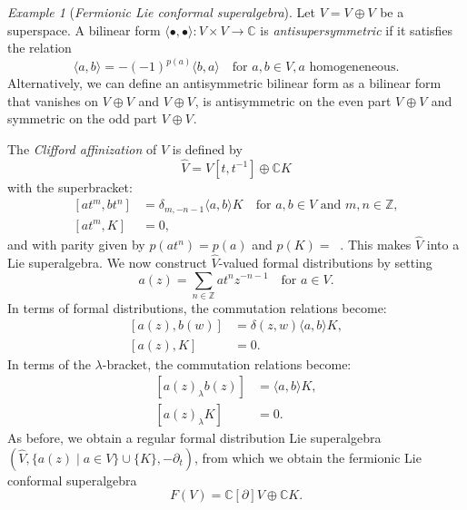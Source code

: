 \documentclass[a4paper, 12pt, reqno]{amsart}
\theoremstyle{remark}
\newtheorem{example}[theorem]{Example}
\numberwithin{equation}{subsection}
\DeclareMathOperator{\zero}{\overline{0}}
\DeclareMathOperator{\one}{\overline{1}}
\begin{document}
\begin{example}[\emph{Fermionic Lie conformal superalgebra}]
  \label{exa:3}
  Let $V = V_{\zero} \oplus V_{\one}$ be a superspace.
  A bilinear form $\langle\bullet, \bullet\rangle: V \times V \to \mathbb{C}$ is \emph{antisupersymmetric} if it satisfies the relation
  \begin{equation*}
    \langle a, b\rangle = -(-1)^{p(a)}\langle b, a\rangle \quad \text{for }a, b \in V, a\text{ homogeneneous}.
  \end{equation*}
  Alternatively, we can define an antisymmetric bilinear form as a bilinear form that vanishes on $V_{\zero} \oplus V_{\one}$ and $V_{\one} \oplus V_{\zero}$, is antisymmetric on the even part $V_{\zero} \oplus V_{\zero}$ and symmetric on the odd part $V_{\one} \oplus V_{\one}$.

  The \emph{Clifford affinization} of $V$ is defined by
  \begin{equation*}
    \widehat{V} = V[t, t^{-1}] \oplus \mathbb{C}K
  \end{equation*}
  with the superbracket:
  \begin{equation*}
    \begin{split}
      [at^m, bt^n] &= \delta_{m, -n - 1}\langle a, b\rangle K \quad \text{for }a, b \in V\text{ and }m, n \in \mathbb{Z}, \\
      [at^m, K] &= 0,
    \end{split}
  \end{equation*}
  and with parity given by $p(at^n) = p(a)$ and $p(K) = \zero$.
  This makes $\widehat{V}$ into a Lie superalgebra.
  We now construct $\widehat{V}$-valued formal distributions by setting
  \begin{equation*}
    a(z) = \sum_{n \in \mathbb{Z}}at^nz^{-n - 1} \quad \text{for }a \in V.
  \end{equation*}
  In terms of formal distributions, the commutation relations become:
  \begin{equation*}
    \begin{split}
      [a(z), b(w)] &= \delta(z, w)\langle a, b\rangle K, \\
      [a(z), K] &= 0.
    \end{split}
  \end{equation*}
  In terms of the $\lambda$-bracket, the commutation relations become:
  \begin{equation*}
    \begin{split}
      [a(z)_{\lambda}b(z)] &= \langle a, b\rangle K, \\
      [a(z)_{\lambda}K] &= 0.
    \end{split}
  \end{equation*}
  As before, we obtain a regular formal distribution Lie superalgebra $(\widehat{V}, \{a(z) \mid a \in V\} \cup \{K\}, -\partial_t)$, from which we obtain the fermionic Lie conformal superalgebra
  \begin{equation*}
    F(V) = \mathbb{C}[\partial]V \oplus \mathbb{C}K.
  \end{equation*}
\end{example}
\end{document}

